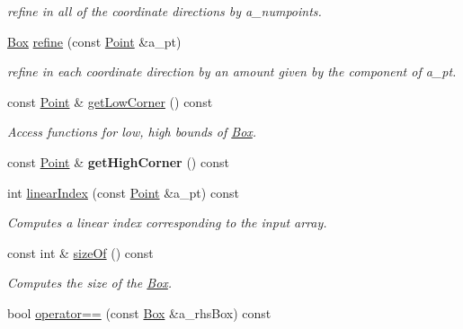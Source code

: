 \begin{DoxyCompactItemize}
\begin{DoxyCompactList}\small\item\em refine in all of the coordinate directions by a\+\_\+numpoints. \end{DoxyCompactList}\item 
\hypertarget{classBox_a967c3dbf4d1b64d9100d2f276f967209}{}\hyperlink{classBox}{Box} \hyperlink{classBox_a967c3dbf4d1b64d9100d2f276f967209}{refine} (const \hyperlink{classPoint}{Point} \&a\+\_\+pt)\label{classBox_a967c3dbf4d1b64d9100d2f276f967209}

\begin{DoxyCompactList}\small\item\em refine in each coordinate direction by an amount given by the component of a\+\_\+pt. \end{DoxyCompactList}\item 
\hypertarget{classBox_a1921ede43e51da40e088145e714cd648}{}const \hyperlink{classPoint}{Point} \& \hyperlink{classBox_a1921ede43e51da40e088145e714cd648}{get\+Low\+Corner} () const \label{classBox_a1921ede43e51da40e088145e714cd648}

\begin{DoxyCompactList}\small\item\em Access functions for low, high bounds of \hyperlink{classBox}{Box}. \end{DoxyCompactList}\item 
\hypertarget{classBox_aab4951e1653eeee8086450863154f32b}{}const \hyperlink{classPoint}{Point} \& {\bfseries get\+High\+Corner} () const \label{classBox_aab4951e1653eeee8086450863154f32b}

\item 
\hypertarget{classBox_a13b7df477ab93b4fe974a5151a6c2196}{}int \hyperlink{classBox_a13b7df477ab93b4fe974a5151a6c2196}{linear\+Index} (const \hyperlink{classPoint}{Point} \&a\+\_\+pt) const \label{classBox_a13b7df477ab93b4fe974a5151a6c2196}

\begin{DoxyCompactList}\small\item\em Computes a linear index corresponding to the input array. \end{DoxyCompactList}\item 
\hypertarget{classBox_a18e496a4a686a834850b5d9720a1c322}{}const int \& \hyperlink{classBox_a18e496a4a686a834850b5d9720a1c322}{size\+Of} () const \label{classBox_a18e496a4a686a834850b5d9720a1c322}

\begin{DoxyCompactList}\small\item\em Computes the size of the \hyperlink{classBox}{Box}. \end{DoxyCompactList}\item 
\hypertarget{classBox_a342008fa11641f5b3b79841692411d44}{}bool \hyperlink{classBox_a342008fa11641f5b3b79841692411d44}{operator==} (const \hyperlink{classBox}{Box} \&a\+\_\+rhs\+Box) const \label{classBox_a342008fa11641f5b3b79841692411d44}


\end{DoxyCompactItemize}
